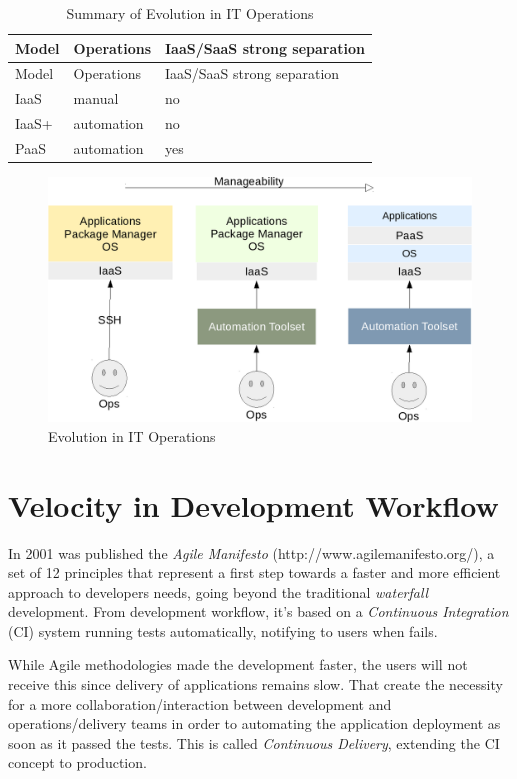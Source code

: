 \begin{longtable}[c]{@{}lll@{}}
\caption{Summary of Evolution in IT Operations}\tabularnewline
\toprule
Model & Operations & IaaS/SaaS strong separation\tabularnewline
\midrule
\endfirsthead
\toprule
Model & Operations & IaaS/SaaS strong separation\tabularnewline
\midrule
\endhead
IaaS & manual & no\tabularnewline
IaaS+ & automation & no\tabularnewline
PaaS & automation & yes\tabularnewline
\bottomrule
\end{longtable}

\begin{figure}[htbp]
\centering
\includegraphics{media/ch2-paas.png}
\caption{Evolution in IT Operations}
\end{figure}

\section{Velocity in Development
Workflow}\label{velocity-in-development-workflow}

In 2001 was published the \textit{Agile Manifesto} (http://www.agilemanifesto.org/), a set of 12 principles that represent a first step towards a faster and more efficient approach to developers needs, going beyond the traditional \textit{waterfall} development. From development workflow, it's based on a \textit{Continuous Integration} (CI) system running tests automatically, notifying to users when fails.

While Agile methodologies made the development faster, the users will not receive this since delivery of applications remains slow. That create the necessity for a more collaboration/interaction between development and operations/delivery teams in order to automating the application deployment as soon as it passed the tests. This is called \textit{Continuous Delivery}, extending the CI concept to production.

